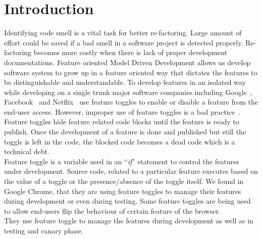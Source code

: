 \documentclass[conference]{IEEEtran}
\begin{document}
\section{Introduction}
Identifying code smell is a vital task for better re-factoring. Large amount of effort could be saved if a bad smell in a software project is detected properly. Re-factoring becomes more costly when there is lack of proper development documentations. Feature oriented Model Driven Development allows us develop software system to grow up in a feature oriented way that dictates the features to be distinguishable and understandable. To develop features in an isolated way while developing on a single trunk major software companies including Google~\cite{ChromeRepidRelease}, Facebook~\cite{Rossi2014Google} and Netflix~\cite{NetFlixCasandra} use feature toggles to enable or disable a feature from the end-user access. However, improper use of feature toggles is a bad practice~\cite{Fowler2010FeatureToggle}. Feature toggles hide feature 
related code blocks until the feature is ready to publish. Once the 
development of a feature is done and published but still the toggle is 
left in the code, the blocked code becomes a dead code which is a technical 
debt.\\

Feature toggle is a variable used in an ``\textit{if}'' statement to control the 
features under development. Source code, related to a particular feature executes 
based on the value of a toggle or the presence/absence of the toggle itself. 
We found in Google Chrome, that they are using feature toggles to manage their 
features during development or even during testing. Some feature toggles are 
being used to allow end-users flip the behaviour of certain feature of the browser.\\

They use feature toggle to manage the features during development as well as 
in testing and canary phase.
\end{document}
